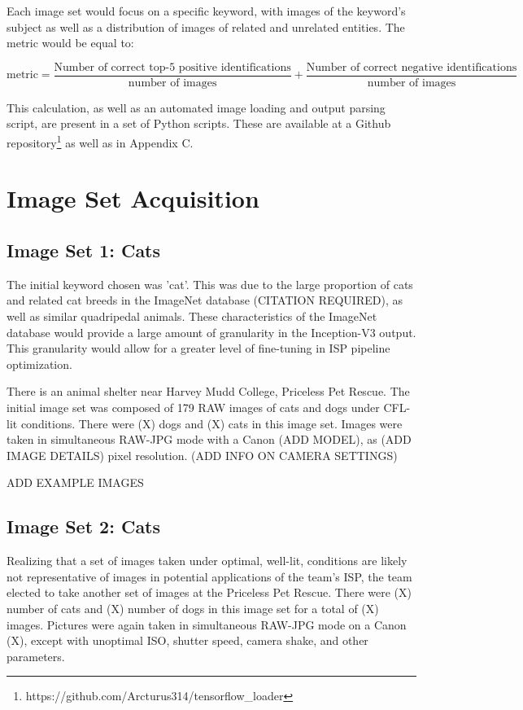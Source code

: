 \documentclass{report}
\begin{document}
		Each image set would focus on a specific keyword, with images of the keyword's subject as well as a distribution of images of related and unrelated entities. The metric would be equal to:
		
		\begin{equation*}
			\text{metric}=\frac{\text{Number of correct top-5 positive identifications}}{\text{number of images}} + \frac{\text{Number of correct negative identifications}}{\text{number of images}}
		\end{equation*}
		
		This calculation, as well as an automated image loading and output parsing script, are present in a set of Python scripts. These are available at a Github repository\footnote{https://github.com/Arcturus314/tensorflow\_loader} as well as in Appendix C.
	\section{Image Set Acquisition}
		\subsection{Image Set 1: Cats}
		The initial keyword chosen was 'cat'. This was due to the large proportion of cats and related cat breeds in the ImageNet database (CITATION REQUIRED), as well as similar quadripedal animals. These characteristics of the ImageNet database would provide a large amount of granularity in the Inception-V3 output. This granularity would allow for a greater level of fine-tuning in ISP pipeline optimization.
		
		There is an animal shelter near Harvey Mudd College, Priceless Pet Rescue\cite{http://pricelesspetrescue.org/}. The initial image set was composed of 179 RAW images of cats and dogs under CFL-lit conditions. There were (X) dogs and (X) cats in this image set. Images were taken in simultaneous RAW-JPG mode with a Canon (ADD MODEL), as (ADD IMAGE DETAILS) pixel resolution. (ADD INFO ON CAMERA SETTINGS)
		
		ADD EXAMPLE IMAGES
		\subsection{Image Set 2: Cats}
		Realizing that a set of images taken under optimal, well-lit, conditions are likely not representative of images in potential applications of the team's ISP, the team elected to take another set of images at the Priceless Pet Rescue. There were (X) number of cats and (X) number of dogs in this image set for a total of (X) images. Pictures were again taken in simultaneous RAW-JPG mode on a Canon (X), except with unoptimal ISO, shutter speed, camera shake, and other parameters.
		
\end{document}
